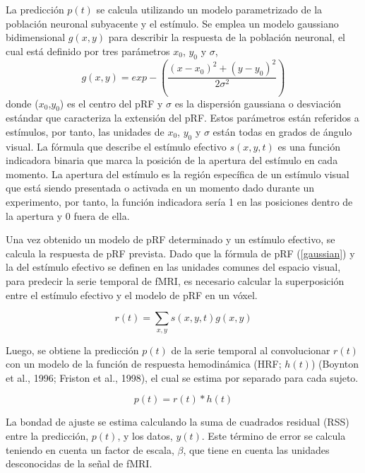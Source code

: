 La predicción $p(t)$ se calcula utilizando un modelo parametrizado de la población neuronal subyacente y el estímulo. Se emplea un modelo gaussiano bidimensional $g(x,y)$ para describir la respuesta de la población neuronal, el cual est\'a definido por tres par\'ametros $x_0$,  $y_0$ y $\sigma$,
\begin{equation}
	g(x,y)=exp-(\frac{(x-x_0)^2+(y-y_0)^2}{2\sigma^2})
	\label{gaussian}
\end{equation}
donde ($x_0$,$y_0$) es el centro del pRF y $\sigma$ es la dispersión gaussiana o desviación estándar que caracteriza la extensi\'on del pRF. Estos parámetros están referidos a estímulos, por tanto, las unidades de $x_0$, $y_0$ y $\sigma$ están todas en grados de ángulo visual. La fórmula que describe el estímulo efectivo $s(x,y,t)$ es una función indicadora binaria que marca la posición de la apertura del estímulo en cada momento. La apertura del est\'imulo es la región específica de un estímulo visual que está siendo presentada o activada en un momento dado durante un experimento, por tanto, la función indicadora ser\'ia 1 en las posiciones dentro de la apertura y 0 fuera de ella.

Una vez obtenido un modelo de pRF determinado y un estímulo efectivo, se calcula la respuesta de pRF prevista. Dado que la fórmula de pRF (\ref{gaussian}) y la del estímulo efectivo se definen en las unidades comunes del espacio visual, para predecir la serie temporal de fMRI, es necesario calcular la superposición entre el estímulo efectivo y el modelo de pRF en un vóxel.

\begin{equation}
	r(t)=\sum_{x,y}s(x,y,t)g(x,y)
\end{equation}

Luego, se obtiene la predicción $p(t)$ de la serie temporal al convolucionar $r(t)$ con un modelo de la función de respuesta hemodinámica (HRF; $h(t)$) (Boynton et al., 1996; Friston et al., 1998), el cual se estima por separado para cada sujeto.

\begin{equation}
	p(t) = r(t) * h(t)
\end{equation}

La bondad de ajuste se estima calculando la suma de cuadrados residual (RSS) entre la predicción, $p(t)$, y los datos, $y(t)$. Este término de error se calcula teniendo en cuenta un factor de escala, $\beta$, que tiene en cuenta las unidades desconocidas de la señal de fMRI.

